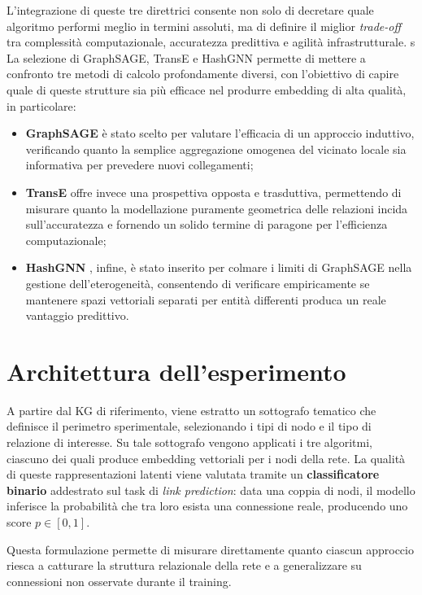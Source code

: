 L'integrazione di queste tre direttrici consente non solo di decretare quale algoritmo performi meglio in termini assoluti, ma di definire il miglior \textit{trade-off} tra complessità computazionale, accuratezza predittiva e agilità infrastrutturale.
s
La selezione di GraphSAGE, TransE e HashGNN permette di mettere a confronto tre metodi di calcolo profondamente diversi, con l'obiettivo di capire quale di queste strutture sia più efficace nel produrre embedding di alta qualità, in particolare:
\begin{itemize}
    \item \textbf{GraphSAGE} \cite{hamilton2017inductive} è stato scelto per valutare l'efficacia di un approccio induttivo, verificando quanto la semplice aggregazione omogenea del vicinato locale sia informativa per prevedere nuovi collegamenti;
    \item \textbf{TransE} \cite{bordes2013translating} offre invece una prospettiva opposta e trasduttiva, permettendo di misurare quanto la modellazione puramente geometrica delle relazioni incida sull'accuratezza e fornendo un solido termine di paragone per l'efficienza computazionale;
    \item  \textbf{HashGNN} \cite{neo4j_hashgnn}, infine, è stato inserito per colmare i limiti di GraphSAGE nella gestione dell'eterogeneità, consentendo di verificare empiricamente se mantenere spazi vettoriali separati per entità differenti produca un reale vantaggio predittivo.    
\end{itemize}



\section{Architettura dell'esperimento}

A partire dal KG di riferimento, viene estratto un sottografo tematico che definisce il perimetro sperimentale, selezionando i tipi di nodo e il tipo di relazione di interesse. Su tale sottografo vengono applicati i tre algoritmi, ciascuno dei quali produce embedding vettoriali per i nodi della rete. La qualità di queste rappresentazioni latenti viene valutata tramite un \textbf{classificatore binario} addestrato sul task di \textit{link prediction}: data una coppia di nodi, il modello inferisce la probabilità che tra loro esista una connessione reale, producendo uno score $p \in [0, 1]$. 

Questa formulazione permette di misurare direttamente quanto ciascun approccio riesca a catturare la struttura relazionale della rete e a generalizzare su connessioni non osservate durante il training.

